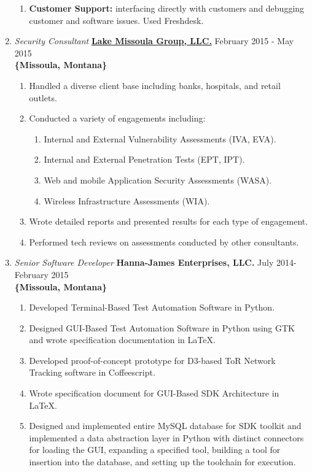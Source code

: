 \documentclass[oneside]{article}%
\begin{document}
\begin{enumerate}[]
\begin{enumerate}[*]
			\item \textbf{Customer Support:} interfacing directly with customers and debugging customer and software issues. Used Freshdesk.
		\end{enumerate}
	\item \textit{Security Consultant} \textbf{\href{https://lmgsecurity.com/}{Lake Missoula Group, LLC.}} \hfill February 2015 - May 2015\\
		\textbf{\{Missoula, Montana\}}
		\begin{enumerate}[*]
			\item Handled a diverse client base including banks, hospitals, and retail outlets.
			\item Conducted a variety of engagements including:
				\begin{enumerate}[.]
					\item Internal and External Vulnerability Assessments (IVA, EVA).
					\item Internal and External Penetration Tests (EPT, IPT).					
					\item Web and mobile Application Security Assessments (WASA).
					\item Wireless Infrastructure Assessments (WIA).
				\end{enumerate}
			\item Wrote detailed reports and presented results for each type of engagement.
			\item Performed tech reviews on assessments conducted by other consultants.
		\end{enumerate}
	\item \textit{Senior Software Developer} \textbf{Hanna-James Enterprises, LLC.} \hfill July 2014-February 2015\\
		\textbf{\{Missoula, Montana\}}
		\begin{enumerate}[*]
			\item Developed Terminal-Based Test Automation Software in Python.
			\item Designed GUI-Based Test Automation Software in Python using GTK and wrote specification documentation in \LaTeX.
			\item Developed proof-of-concept prototype for D3-based ToR Network Tracking software in Coffeescript.
			\item Wrote specification document for GUI-Based SDK Architecture in \LaTeX.
			\item Designed and implemented entire MySQL database for SDK toolkit and implemented a data abstraction layer in Python with distinct connectors for loading the GUI, expanding a specified tool, building a tool for insertion into the database, and setting up the toolchain for execution.
		\end{enumerate}
\end{enumerate}
\end{document}
